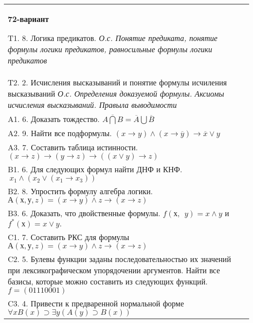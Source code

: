 \documentclass{article}
\begin{document}
\begin{tabular}{m{17cm}}
\textbf{72-вариант}
\newline

T1. 8. Логика предикатов. \emph{О.с. Понятие предиката, понятие формулы логики предикатов, равносильные формулы логики предикатов} \\
T2. 2. Исчисления высказываний и понятие формулы исчиления высказываний \emph{О.с. Определения доказуемой формулы. Аксиомы исчисления высказываний. Правыла выводимости} \\
A1. 6. Доказать тождество. \(\overline{A\bigcap B} = \overline{A}\bigcup\overline{B}\) \\
A2. 9. Найти все подформулы. \((x \rightarrow y) \land (x \rightarrow \overline{y}) \rightarrow \overline{x} \vee y\) \\
A3. 7. Составить таблица истинности. \((x \rightarrow z) \rightarrow (y \rightarrow z) \rightarrow ((x \vee y) \rightarrow z)\) \\
B1. 6. Для следующих формул найти ДНФ и КНФ. \(\ x_{1} \land (x_{2} \vee (x_{1} \rightarrow x_{3}))\) \\
B2. 8. Упростить формулу алгебра логики. \(А(х,у,z) = (x \rightarrow y) \land z \rightarrow (x \rightarrow z)\) \\
B3. 6. Доказать, что двойственные формулы. \(f(х,\ \ y) = x \land y\) и \(f^{*}(х) = x \vee y.\) \\
C1. 7. Составить РКС для формулы \(А(х,у,z) = (x \rightarrow y) \land z \rightarrow (x \rightarrow z)\) \\
C2. 5. Булевы функции заданы последовательностью их значений при лексикографическом упорядочении аргументов. Найти все базисы, которые можно составить из следующих функций. \(f = (01110001)\) \\
C3. 4. Привести к предваренной нормальной форме \(\forall xB(x) \supset \exists y(A(y) \supset B(x))\) \\

\end{tabular}
\vspace{1cm}
\end{document}
